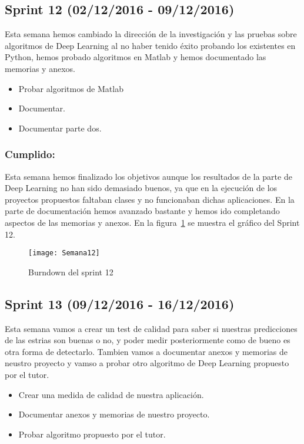 \subsection{Sprint 12 (02/12/2016 - 09/12/2016)}
Esta semana hemos cambiado la dirección de la investigación y las pruebas sobre algoritmos de Deep Learning al no haber tenido éxito probando los existentes en Python, hemos probado algoritmos en Matlab y hemos documentado las memorias y anexos.

\begin{itemize}
	\item Probar algoritmos de Matlab
	\item Documentar.
	\item Documentar parte dos.
\end{itemize}

\subsubsection{Cumplido:}
Esta semana hemos finalizado los objetivos aunque los resultados de la parte de Deep Learning no han sido demasiado buenos, ya que en la ejecución de los proyectos propuestos faltaban clases y no funcionaban dichas aplicaciones.
En la parte de documentación hemos avanzado bastante y hemos ido completando aspectos de las memorias y anexos.
En la figura~\ref{fig:A.2.12} se muestra el gráfico del Sprint 12.

\begin{figure}[h]
\centering
\texttt{[image: Semana12]}
\caption{Burndown del sprint 12}
\label{fig:A.2.12}
\end{figure}

\subsection{Sprint 13 (09/12/2016 - 16/12/2016)}
Esta semana vamos a crear un test de calidad para saber si nuestras predicciones de las estrias son buenas o no, y poder medir posteriormente como de bueno es otra forma de detectarlo.
Tambien vamos a documentar anexos y memorias de neustro proyecto y vamso a probar otro algoritmo de Deep Learning propuesto por el tutor.

\begin{itemize}
\item Crear una medida de calidad de nuestra aplicación.
\item Documentar anexos y memorias de nuestro proyecto.
\item Probar algoritmo propuesto por el tutor.
\end{itemize}
